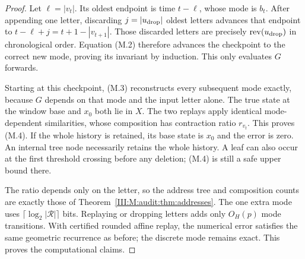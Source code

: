 \begin{proof}
Let $\ell=|v_t|$. Its oldest endpoint is time $t-\ell$, whose mode is $b_t$.
After appending one letter, discarding $j=|u_{\rm drop}|$ oldest letters
advances that endpoint to $t-\ell+j=t+1-|v_{t+1}|$. Those discarded letters
are precisely $\operatorname{rev}(u_{\rm drop})$ in chronological order.
Equation (M.2) therefore advances the checkpoint to the correct new mode,
proving its invariant by induction. This only evaluates $G$ forwards.

Starting at this checkpoint, (M.3) reconstructs every subsequent mode exactly,
because $G$ depends on that mode and the input letter alone. The true state
at the window base and $x_0$ both lie in $X$. The two replays apply identical
mode-dependent similarities, whose composition has contraction ratio
$r_{v_t}$. This proves (M.4). If the whole history is retained, its base state
is $x_0$ and the error is zero. An internal tree node necessarily retains the
whole history. A leaf can also occur at the first threshold crossing before
any deletion; (M.4) is still a safe upper bound there.

The ratio depends only on the letter, so the address tree and composition
counts are exactly those of Theorem~\ref{III:M:audit:thm:addresses}. The one extra mode
uses $\lceil\log_2|\mathcal R|\rceil$ bits. Replaying or dropping letters
adds only $O_H(p)$ mode transitions. With certified rounded affine replay,
the numerical error satisfies the same geometric recurrence as before;
the discrete mode remains exact. This proves the computational claims.
\end{proof}
